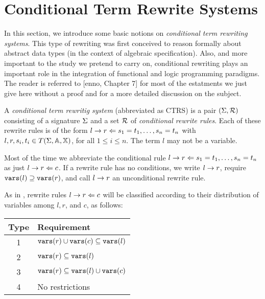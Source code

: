 \section{Conditional Term Rewrite Systems}
In this section, we introduce some basic notions on \textit{conditional term rewriting systems}. This type of rewriting was first conceived to reason formally about abstract data types (in the context of algebraic specification). Also, and more important to the study we pretend to carry on, conditional rewriting plays an important role in the integration of functional and logic programming paradigms. The reader is referred to [enno, Chapter 7] for most of the estatments we just give here without a proof and for a more detailed discussion on the subject.

\begin{definition}
    A \textit{conditional term rewritig system} (abbreviated as CTRS) is a pair $(\Sigma, \mathcal{R})$ consisting of a signature $\Sigma$ and a set $\mathcal{R}$ of \textit{conditional rewrite rules}. Each of these rewrite rules is of the form $l \rightarrow r \Leftarrow s_1 = t_1, \dots, s_n = t_n$ with $l, r, s_i, t_i \in T(\Sigma,\mathbb{A},\mathbb{X})$, for all $1 \leq i \leq n$. The term $l$ may not be a variable.
\end{definition}

Most of the time we abbreviate the conditional rule $l \rightarrow r \Leftarrow s_1 = t_1, \dots, s_n = t_n$ as just $l \rightarrow r \Leftarrow c$. If a rewrite rule has no conditions, we write $l \rightarrow r$, require $\mathtt{vars}(l) \supseteq \mathtt{vars}(r)$, and call $l \rightarrow r$ an unconditional rewrite rule.

As in \cite{Middeldorp1994}, rewrite rules $l \rightarrow r \Leftarrow c$ will be classified according to their distribution of variables among $l, r$, and $c$, as follows:

\begin{table}[h!]
    \centering
    \begin{tabular}{c | l }
    \cline{1-2}
        Type & Requirement \\
    \hline
    1 & $\mathtt{vars}(r) \cup \mathtt{vars}(c) \subseteq \mathtt{vars}(l)$\\
    2 & $\mathtt{vars}(r) \subseteq  \mathtt{vars}(l)$ \\
    3 & $\mathtt{vars}(r) \subseteq \mathtt{vars}(l) \cup \mathtt{vars}(c)$ \\
    4 & No restrictions
    \end{tabular}
\end{table}

